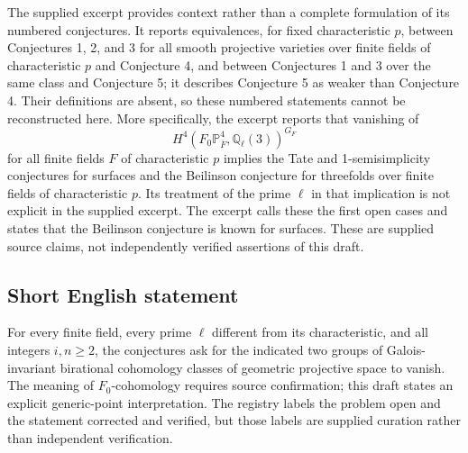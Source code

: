 \documentclass[11pt]{article}
\begin{document}
The supplied excerpt provides context rather than a complete formulation of its numbered conjectures. It reports equivalences, for fixed characteristic \(p\), between Conjectures 1, 2, and 3 for all smooth projective varieties over finite fields of characteristic \(p\) and Conjecture 4, and between Conjectures 1 and 3 over the same class and Conjecture 5; it describes Conjecture 5 as weaker than Conjecture 4. Their definitions are absent, so these numbered statements cannot be reconstructed here. More specifically, the excerpt reports that vanishing of
\[
H^4\!\left(F_0\mathbb P^4_{\overline F},\mathbb Q_\ell(3)\right)^{G_F}
\]
for all finite fields \(F\) of characteristic \(p\) implies the Tate and 1-semisimplicity conjectures for surfaces and the Beilinson conjecture for threefolds over finite fields of characteristic \(p\). Its treatment of the prime \(\ell\) in that implication is not explicit in the supplied excerpt. The excerpt calls these the first open cases and states that the Beilinson conjecture is known for surfaces. These are supplied source claims, not independently verified assertions of this draft.
\subsection{Short English statement}
For every finite field, every prime \(\ell\) different from its characteristic, and all integers \(i,n\ge2\), the conjectures ask for the indicated two groups of Galois-invariant birational cohomology classes of geometric projective space to vanish. The meaning of \(F_0\)-cohomology requires source confirmation; this draft states an explicit generic-point interpretation. The registry labels the problem open and the statement corrected and verified, but those labels are supplied curation rather than independent verification.
\end{document}
